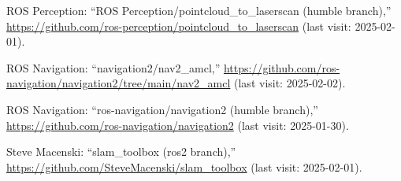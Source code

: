 \documentclass[twocolumn,9pt]{jsproceedings}
\begin{document}
\begin{thebibliography}{99}




  ROS Perception: ``ROS Perception/pointcloud\_to\_laserscan (humble branch),'' \url{https://github.com/ros-perception/pointcloud_to_laserscan} (last visit: 2025-02-01).

  
  ROS Navigation: ``navigation2/nav2\_amcl,'' \url{https://github.com/ros-navigation/navigation2/tree/main/nav2_amcl}  (last visit: 2025-02-02).

  ROS Navigation: ``ros-navigation/navigation2 (humble branch),'' \url{https://github.com/ros-navigation/navigation2} (last visit: 2025-01-30).

  Steve Macenski: ``slam\_toolbox (ros2 branch),'' \url{https://github.com/SteveMacenski/slam_toolbox} (last visit: 2025-02-01).





\end{thebibliography}
\end{document}
